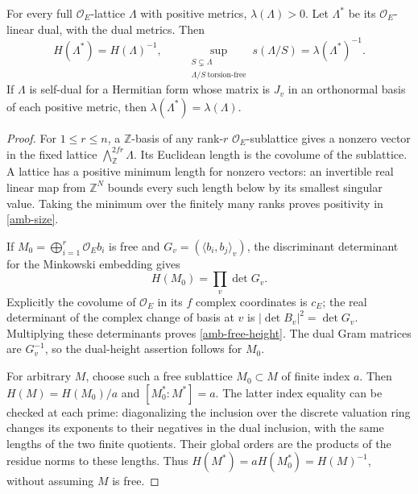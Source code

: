 \begin{lemma}\label{amb-size-duality}
For every full $\mathcal O_E$-lattice $\Lambda$ with positive
metrics, $\lambda(\Lambda)>0$. Let $\Lambda^*$ be its
$\mathcal O_E$-linear dual, with the dual metrics. Then
\begin{equation}\label{amb-height-dual}
 H(\Lambda^*)=H(\Lambda)^{-1},\qquad
 \sup_{\substack{S\subsetneq\Lambda\\\Lambda/S\ \text{torsion-free}}}
              s(\Lambda/S)=\lambda(\Lambda^*)^{-1}.
\end{equation}
If $\Lambda$ is self-dual for a Hermitian form whose matrix is
$J_v$ in an orthonormal basis of each positive metric, then
$\lambda(\Lambda^*)=\lambda(\Lambda)$.
\end{lemma}
\begin{proof}
For $1\le r\le n$, a $\mathbb Z$-basis of any rank-$r$
$\mathcal O_E$-sublattice gives a nonzero vector in the fixed
lattice $\bigwedge^{2fr}_{\mathbb Z}\Lambda$. Its Euclidean
length is the covolume of the sublattice. A lattice has a positive
minimum length for nonzero vectors: an invertible real linear
map from $\mathbb Z^N$ bounds every such length below by its
smallest singular value. Taking the minimum over the finitely
many ranks proves positivity in \eqref{amb-size}.

If $M_0=\bigoplus_{i=1}^r\mathcal O_E b_i$ is free and
$G_v=(\langle b_i,b_j\rangle_v)$, the discriminant determinant
for the Minkowski embedding gives
\begin{equation}\label{amb-free-height}
                       H(M_0)=\prod_v\det G_v.
\end{equation}
Explicitly the covolume of $\mathcal O_E$ in its $f$ complex
coordinates is $c_E$; the real determinant of the complex change
of basis at $v$ is $|\det B_v|^2=\det G_v$. Multiplying these
determinants proves \eqref{amb-free-height}. The dual Gram
matrices are $G_v^{-1}$, so the dual-height assertion follows
for $M_0$.

For arbitrary $M$, choose such a free sublattice $M_0\subset M$
of finite index $a$. Then $H(M)=H(M_0)/a$ and
$[M_0^*:M^*]=a$. The latter index equality can be checked at
each prime: diagonalizing the inclusion over the discrete
valuation ring changes its exponents to their negatives in the
dual inclusion, with the same lengths of the two finite
quotients. Their global orders are the products of the residue
norms to these lengths. Thus
$H(M^*)=aH(M_0^*)=H(M)^{-1}$, without assuming $M$ is free.


\end{proof}
